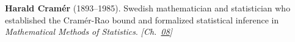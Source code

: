 \textbf{Harald Cramér} (1893–1985). Swedish mathematician and statistician who established the Cram\'{e}r-Rao bound and formalized statistical inference in \emph{Mathematical Methods of Statistics}. \emph{[Ch.~\hyperref[ch:boundedprimegaps]{08}]}

